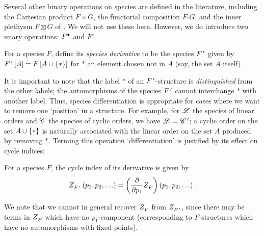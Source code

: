 \documentclass[sectionflow,singlespace,twoside,boldmathhdr,draft]{brandiss} %
\numberwithin{section}{chapter}
\numberwithin{figure}{chapter}
\begin{document}
Several other binary operations on species are defined in the literature, including the Cartesian product $F \times G$, the functorial composition $F \square G$, and the inner plethysm $F \boxtimes G$ of \cite{travis:inpleth}.
We will not use these here.
However, we do introduce two unary operations: $ {F}^{\bullet } $ and $F'$.

\begin{definition}
  \label{def:specderiv}
  For a species $F$, define its \emph{species derivative} to be the species $ {F}^{\,\prime } $ given by $ {F}^{\,\prime }  \left[ {A} \right] = F \left[ {A \cup \left\{ {*} \right\}} \right]$ for $*$ an element chosen not in $A$ (say, the set $A$ itself).
\end{definition}
It is important to note that the label $*$ of an $ {F}^{\,\prime } $-structure is \emph{distinguished} from the other labels; the automorphisms of the species $ {F}^{\,\prime } $ cannot interchange $*$ with another label.
Thus, species differentiation is appropriate for cases where we want to remove one `position' in a structure.
For example, for $\mathscr{L}$ the species of linear orders and $\mathscr{C}$ the species of cyclic orders, we have $\mathscr{L} =  {\mathscr{C}}^{\,\prime } $; a cyclic order on the set $A \cup \left\{ {*} \right\}$ is naturally associated with the linear order on the set $A$ produced by removing $*$.
Terming this operation `differentiation' is justified by its effect on cycle indices:
\begin{theorem}
  \label{thm:specderivci}
  For a species $F$, the cycle index of its derivative is given by
  \begin{equation}
    \label{eq:specderivci}
     Z_{ {F}^{\,\prime } }^{}  \left( {p_{1}, p_{2}, \dots} \right) = \left( {\frac{\partial}{\partial p_{1}}  Z_{F}^{} } \right) \left( {p_{1}, p_{2}, \dots} \right).
  \end{equation}
\end{theorem}
We note that we cannot in general recover $ Z_{F}^{} $ from $ Z_{ {F}^{\,\prime } }^{} $, since there may be terms in $ Z_{F}^{} $ which have no $p_{1}$-component (corresponding to $F$-structures which have no automorphisms with fixed points).
\end{document}
